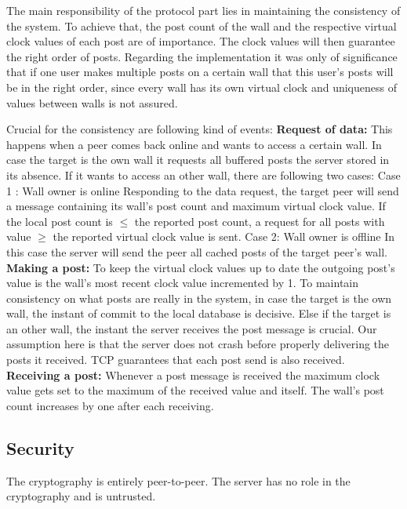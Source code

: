 \documentclass{report}
\begin{document}
The main responsibility of the protocol part lies in maintaining the consistency of the system. To achieve that, the post count of the wall and the respective virtual clock values of each post are of importance. The clock values will then guarantee the right order of posts. Regarding the implementation it was only of significance that if one user makes multiple posts on a certain wall that this user's posts will be in the right order, since every wall has its own virtual clock and uniqueness of values between walls is not assured.

Crucial for the consistency are following kind of events:\newline
\textbf{Request of data:} This happens when a peer comes back online and wants to access a certain wall.  
In case the target is the own wall it requests all buffered posts the server stored in its absence.
If it wants to access an other wall, there are following two cases:\newline
Case 1 : Wall owner is online
Responding to the data request, the target peer will send a message containing its wall's post count and maximum virtual clock value. If the local post count is $\leq$ the reported post count, a request for all posts with value $\geq$ the reported virtual clock value is sent.\newline
Case 2: Wall owner is offline
In this case the server will send the peer all cached posts of the target peer's wall.\newline
\textbf{Making a post:}
To keep the virtual clock values up to date the outgoing post's value is the wall's most recent clock value incremented by 1.\newline
To maintain consistency on what posts are really in the system, in case the target is the own wall, the instant of commit to the local database is decisive.
Else if the target is an other wall, the instant the server receives the post message is crucial. Our assumption here is that the server does not crash before properly delivering the posts it received. TCP guarantees that each post send is also received.\newline
\textbf{Receiving a post:}
Whenever a post message is received the maximum clock value gets set to the maximum of the received value and itself.  The wall's post count increases by one after each receiving.

\subsection{Security}
The cryptography is entirely peer-to-peer. The server has no role in the cryptography and is untrusted.
\end{document}
